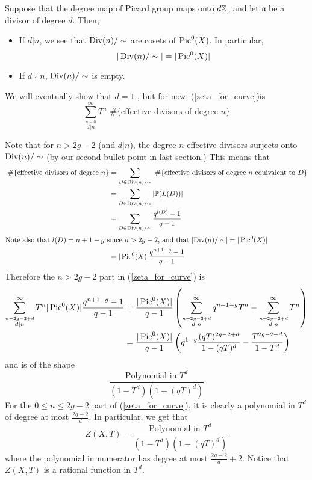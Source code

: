Suppose that the degree map of Picard group maps onto $d\mathbb{Z}$, and let $\mathfrak{a}$ be a divisor of degree $d$. Then,
\begin{itemize}
    \item If $d|n$, we see that $\operatorname{Div}(n)/\sim$ are cosets of $\operatorname{Pic}^0(X)$. In particular,
    \[
    |\operatorname{Div}(n)/\sim| = |\operatorname{Pic}^0(X)|
    \]
    \item If $d\nmid n$, $\operatorname{Div}(n)/\sim$ is empty.
\end{itemize}
We will eventually show that $d = 1$ , but for now, (\ref{zeta_for_curve})is
\[
\sum_{\stackrel{n=0}{d|n}}^{\infty} T^n \text{ \#\{effective divisors of degree $n$\}}
\]

Note that for $n > 2g-2$ (and $d|n$), the degree $n$ effective divisors surjects onto $\operatorname{Div}(n)/\sim$ (by our second bullet point in last section.) This means that 
\begin{align*}
    \text{ \#\{effective divisors of degree $n$\}} &= \sum_{D \in \operatorname{Div}(n)/\sim} \text{ \#\{effective divisors of degree $n$ equivalent to $D$\}} \\
    &= \sum_{D \in \operatorname{Div}(n)/\sim} |\mathbb{P}(L(D))| \\
    &= \sum_{D \in \operatorname{Div}(n)/\sim} \frac{q^{l(D)}-1}{q-1} \\
\intertext{Note also that $l(D) = n + 1 - g$ since $n > 2g-2$, and that $\left|\operatorname{Div}(n)/\sim\right| = |\operatorname{Pic}^0(X)|$}
    &= |\operatorname{Pic}^0(X)| \frac{q^{n+1 - g}-1}{q-1}
\end{align*}
Therefore the $n > 2g-2$ part in (\ref{zeta_for_curve}) is
\begin{align*}
    \sum_{\stackrel{n = 2g-2+d}{d|n}}^{\infty} T^n |\operatorname{Pic}^0(X)| \frac{q^{n+1 - g}-1}{q-1} &= \frac{|\operatorname{Pic}^0(X)|}{q-1} \left(\sum_{\stackrel{n = 2g-2+d}{d|n}}^{\infty} q^{n+1-g}T^n - \sum_{\stackrel{n = 2g-2+d}{d|n}}^{\infty} T^n\right)  \\
    &= \frac{|\operatorname{Pic}^0(X)|}{q-1} \left(q^{1-g} \frac{(qT)^{2g-2+d}}{1-(qT)^d} - \frac{T^{2g-2+d}}{1-T^d}\right) \\
\end{align*}
and is of the shape
\[
\frac{\text{Polynomial in $T^d$}}{(1-T^d)(1-(qT)^d)}
\]
For the $0 \leq n \leq 2g-2$ part of (\ref{zeta_for_curve}), it is clearly a polynomial in $T^d$ of degree at most $\frac{2g-2}{d}$. In particular, we get that 
\[
Z(X,T) = \frac{\text{Polynomial in $T^d$}}{(1-T^d)(1-(qT)^d)}
\]
where the polynomial in numerator has degree at most $\frac{2g-2}{d} + 2$. Notice that $Z(X,T)$ is a rational function in $T^d$.

